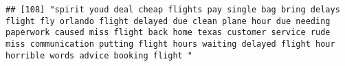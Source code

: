 \documentclass[
]{article}
\begin{document}
\begin{verbatim}
## [108] "spirit youd deal cheap flights pay single bag bring delays flight fly orlando flight delayed due clean plane hour due needing paperwork caused miss flight back home texas customer service rude miss communication putting flight hours waiting delayed flight hour horrible words advice booking flight "                                                                                                                                                                                                                                                                                                                                                                                                                                                                                                                                                                                                                                                                                                                                                                                                                                                                                                                                                                                                                                                                                                                                                                                                                                                                                                                                                                                                                                                                                    

\end{verbatim}
\end{document}
